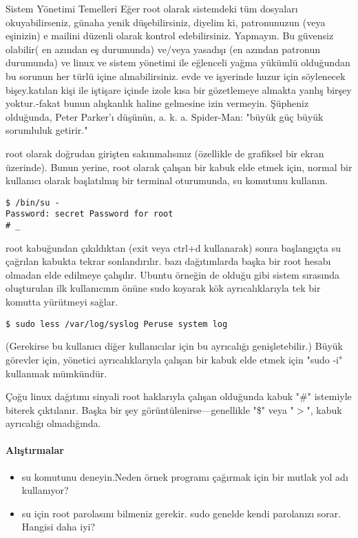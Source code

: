 \begin{section}{Sistem Yönetimi Temelleri}
Eğer root olarak sistemdeki tüm dosyaları okuyabilirseniz, günaha yenik düşebilirsiniz, diyelim ki, patronunuzun (veya eşinizin) e mailini düzenli olarak kontrol edebilirsiniz. Yapmayın. Bu güvensiz olabilir( en azından eş durumunda) ve/veya yasadışı (en azından patronun durumunda) ve linux ve sistem yönetimi ile eğlenceli yağma yükümlü olduğundan bu sorunun her türlü içine alınabilirsiniz. evde ve işyerinde huzur için söylenecek bişey.katılan kişi ile iştişare içinde izole kısa bir gözetlemeye almakta yanlış birşey yoktur.-fakat bunun alışkanlık haline gelmesine izin vermeyin. Şüpheniz olduğunda, Peter Parker'ı düşünün, a. k. a. Spider-Man: "büyük güç büyük sorumluluk getirir."

root olarak doğrudan girişten sakınmalısınız (özellikle de grafiksel bir ekran üzerinde). Bunun yerine, root olarak çalışan bir kabuk elde etmek için, normal bir kullanıcı olarak başlatılmış bir terminal oturumunda, su komutunu kullanın.
\begin{verbatim}
$ /bin/su -
Password: secret Password for root
# _
\end{verbatim}

root kabuğundan çıkıldıktan (exit veya ctrl+d kullanarak) sonra  başlangıçta su çağrılan kabukta tekrar sonlandırılır. bazı dağıtımlarda başka bir root hesabı olmadan elde edilmeye çalışılır. Ubuntu örneğin de olduğu gibi sistem sırasında oluşturulan ilk kullanıcının önüne sudo koyarak kök ayrıcalıklarıyla tek bir komutta yürütmeyi sağlar.
\begin{verbatim}
$ sudo less /var/log/syslog Peruse system log
\end{verbatim}

(Gerekirse bu kullanıcı diğer kullanıcılar için bu ayrıcalığı genişletebilir.)
Büyük görevler için, yönetici ayrıcalıklarıyla çalışan bir kabuk elde etmek için "sudo -i" kullanmak mümkündür. 

Çoğu linux dağıtımı sinyali root haklarıyla çalışan olduğunda kabuk "\#" istemiyle biterek çıktılanır. Başka bir şey görüntülenirse—genellikle "\$" veya "$>$", kabuk ayrıcalığı olmadığında.

\paragraph{Alıştırmalar}{
\begin{itemize}
 \item su komutunu deneyin.Neden örnek programı çağırmak için bir mutlak yol adı kullanıyor?
 \item su için root parolasını bilmeniz gerekir. sudo genelde kendi parolanızı sorar. Hangisi daha iyi?
\end{itemize}}
\end{section}

